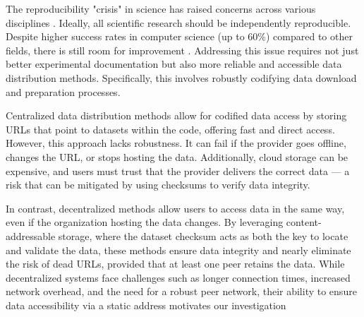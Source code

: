 \documentclass[10pt,twocolumn,letterpaper]{article}
\begin{document}





The reproducibility "crisis" in science has raised concerns across various disciplines
  \cite{baker_reproducibility_2016}.
Ideally, all scientific research should be independently reproducible.
Despite higher success rates in computer science (up to 60\%) compared to other fields, there is still room for improvement
\cite{NEURIPS2019_c429429b, collberg2016repeatability, desai_what_2024}.
Addressing this issue requires not just better experimental documentation but also more reliable and
  accessible data distribution methods.
Specifically, this involves robustly codifying data download and preparation processes.


Centralized data distribution methods allow for codified data access by storing URLs that point to datasets
  within the code, offering fast and direct access.
However, this approach lacks robustness.
It can fail if the provider goes offline, changes the URL, or stops hosting the data.
Additionally, cloud storage can be expensive, and users must trust that the provider delivers the correct
  data --- a risk that can be mitigated by using checksums to verify data integrity.

In contrast, decentralized methods allow users to access data in the same way, even if the organization
  hosting the data changes.
By leveraging content-addressable storage, where the dataset checksum acts as both the key to locate and
  validate the data, these methods ensure data integrity and nearly eliminate the risk of dead URLs, provided
  that at least one peer retains the data.
While decentralized systems face challenges such as longer connection times, increased network overhead, and
  the need for a robust peer network, their ability to ensure data accessibility via a static address
  motivates our investigation
\end{document}
